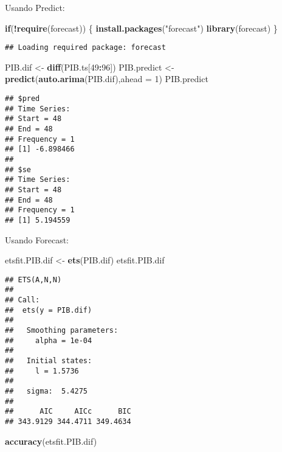 \documentclass[]{article}
\newenvironment{Shaded}{\begin{snugshade}}{\end{snugshade}}
\newcommand{\KeywordTok}[1]{\textcolor[rgb]{0.13,0.29,0.53}{\textbf{#1}}}
\newcommand{\DataTypeTok}[1]{\textcolor[rgb]{0.13,0.29,0.53}{#1}}
\newcommand{\DecValTok}[1]{\textcolor[rgb]{0.00,0.00,0.81}{#1}}
\newcommand{\StringTok}[1]{\textcolor[rgb]{0.31,0.60,0.02}{#1}}
\newcommand{\ControlFlowTok}[1]{\textcolor[rgb]{0.13,0.29,0.53}{\textbf{#1}}}
\newcommand{\OperatorTok}[1]{\textcolor[rgb]{0.81,0.36,0.00}{\textbf{#1}}}
\newcommand{\NormalTok}[1]{#1}
\begin{document}
Usando Predict:

\begin{Shaded}
\begin{Highlighting}[]
\ControlFlowTok{if}\NormalTok{(}\OperatorTok{!}\KeywordTok{require}\NormalTok{(forecast)) \{}
  \KeywordTok{install.packages}\NormalTok{(}\StringTok{"forecast"}\NormalTok{)}
  \KeywordTok{library}\NormalTok{(forecast)}
\NormalTok{\}}
\end{Highlighting}
\end{Shaded}

\begin{verbatim}
## Loading required package: forecast
\end{verbatim}

\begin{Shaded}
\begin{Highlighting}[]
\NormalTok{PIB.dif <-}\StringTok{ }\KeywordTok{diff}\NormalTok{(PIB.ts[}\DecValTok{49}\OperatorTok{:}\DecValTok{96}\NormalTok{])}
\NormalTok{PIB.predict <-}\StringTok{ }\KeywordTok{predict}\NormalTok{(}\KeywordTok{auto.arima}\NormalTok{(PIB.dif),}\DataTypeTok{ahead =} \DecValTok{1}\NormalTok{)}
\NormalTok{PIB.predict}
\end{Highlighting}
\end{Shaded}

\begin{verbatim}
## $pred
## Time Series:
## Start = 48 
## End = 48 
## Frequency = 1 
## [1] -6.898466
## 
## $se
## Time Series:
## Start = 48 
## End = 48 
## Frequency = 1 
## [1] 5.194559
\end{verbatim}

Usando Forecast:

\begin{Shaded}
\begin{Highlighting}[]
\NormalTok{etsfit.PIB.dif <-}\StringTok{ }\KeywordTok{ets}\NormalTok{(PIB.dif)}
\NormalTok{etsfit.PIB.dif}
\end{Highlighting}
\end{Shaded}

\begin{verbatim}
## ETS(A,N,N) 
## 
## Call:
##  ets(y = PIB.dif) 
## 
##   Smoothing parameters:
##     alpha = 1e-04 
## 
##   Initial states:
##     l = 1.5736 
## 
##   sigma:  5.4275
## 
##      AIC     AICc      BIC 
## 343.9129 344.4711 349.4634
\end{verbatim}

\begin{Shaded}
\begin{Highlighting}[]
\KeywordTok{accuracy}\NormalTok{(etsfit.PIB.dif)}
\end{Highlighting}
\end{Shaded}
\end{document}
